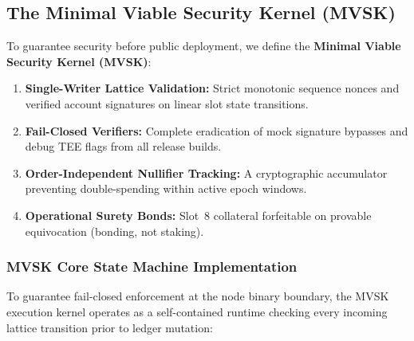 \documentclass[a4paper,11pt,twoside,parskip=half-,headings=small]{scrartcl}
\begin{document}
\subsection{The Minimal Viable Security Kernel (MVSK)}
\label{sec:mvsk}

To guarantee security before public deployment, we define the \textbf{Minimal Viable Security Kernel (MVSK)}:
\begin{enumerate}
  \item \textbf{Single-Writer Lattice Validation:} Strict monotonic sequence nonces and verified account signatures on linear slot state transitions.
  \item \textbf{Fail-Closed Verifiers:} Complete eradication of mock signature bypasses and debug TEE flags from all release builds.
  \item \textbf{Order-Independent Nullifier Tracking:} A cryptographic accumulator preventing double-spending within active epoch windows.
  \item \textbf{Operational Surety Bonds:} Slot~8 collateral forfeitable on provable equivocation (bonding, not staking).
\end{enumerate}

\subsubsection{MVSK Core State Machine Implementation}

To guarantee fail-closed enforcement at the node binary boundary, the MVSK execution
kernel operates as a self-contained runtime checking every incoming lattice transition
prior to ledger mutation:
\end{document}
